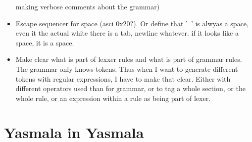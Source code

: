 \documentclass[a4paper]{report}
\begin{document}
\begin{itemize}
      making verbose comments about the grammar)      
\item Escape sequencer for space (asci 0x20?). Or define that '\ ' is alwyas
  a space, even it the actual white there is a tab, newline whatever. if it  looks like a space, it is a space.
\item Make clear what is part of lexxer rules and what is part of grammar
      rules. The grammar only knows tokens. Thus when I want to generate
      different tokens with regular expressions, I have to make that clear.
      Either with different operators used than for grammar, or to tag a whole
      section, or the whole rule, or an expression within a rule as being part
      of lexer.
\end{itemize}

\chapter{Yasmala in Yasmala}
\end{document}
